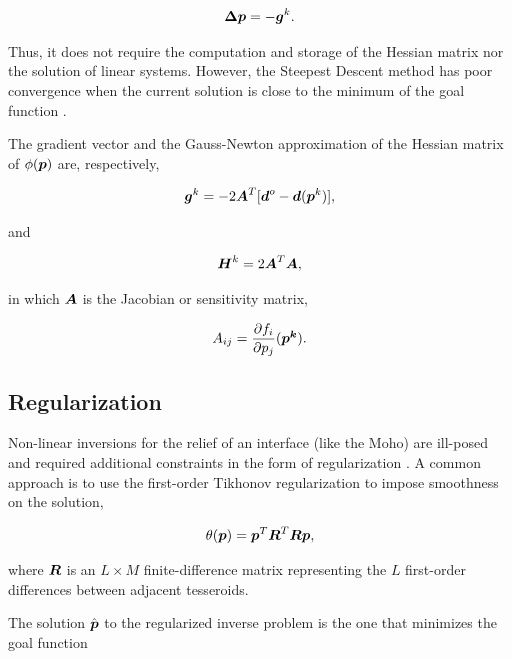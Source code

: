 \documentclass[extra,mreferee]{gji}
\newcommand{\mbf}[1]{\hbox{\mathversion{bold}$#1$}}
\begin{document}
\begin{equation}
    \mbf{\Delta p} = -\mbf{g}^k.
    \label{eq:steepest}
\end{equation}

\noindent
Thus, it does not require the computation and storage of the Hessian matrix
nor the solution of linear systems.
However, the Steepest Descent method has poor convergence when the
current solution is close to the minimum of the goal function
\citep{kelley_iterative_1987}.

The gradient vector and the Gauss-Newton approximation of the Hessian matrix
of $\phi(\mbf{p})$ are, respectively,

\begin{equation}
    \mbf{g}^k = -2\mbf{A}^T[\mbf{d}^o - \mbf{d}(\mbf{p}^k)],
    \label{eq:gradient}
\end{equation}

\noindent
and

\begin{equation}
    \mbf{H}^k = 2\mbf{A}^T\mbf{A},
    \label{eq:hessian}
\end{equation}

\noindent in which
$\mbf{A}$ is the Jacobian or sensitivity matrix,

\begin{equation}
    A_{ij} = \dfrac{\partial f_i}{\partial p_j}(\mbf{p^k}).
    \label{eq:jacobian}
\end{equation}



\subsection{Regularization}

Non-linear inversions for the relief of an interface (like
the Moho) are ill-posed and required additional constraints in the form of
regularization \citep{silva_potential-field_2001}.
A common approach is to use the first-order Tikhonov regularization to impose
smoothness on the solution,

\begin{equation}
    \theta(\mbf{p}) = \mbf{p}^T\mbf{R}^T\mbf{R}\mbf{p},
\end{equation}

\noindent where $\mbf{R}$ is an $L \times M$ finite-difference matrix
representing the $L$ first-order differences between adjacent tesseroids.

The solution $\hat{\mbf{p}}$ to the regularized inverse problem is the one that
minimizes the goal function
\end{document}
